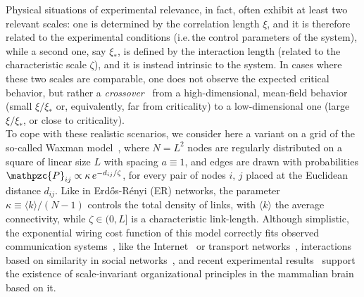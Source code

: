 \documentclass[aps, groupedaddress, superscriptaddress, prl, reprint]{revtex4-1}
\begin{document}
Physical situations of experimental relevance, in fact, often exhibit at least two relevant scales: one is determined by the correlation length $\xi$, and it is therefore related to the experimental conditions (i.e.\,the control parameters of the system), while a second one, say $\xi_*$, is defined by the interaction length (related to the characteristic scale $\zeta$), and it is instead intrinsic to the system.
In cases where these two scales are comparable, one does not observe the expected critical behavior, but rather a {\em crossover}~\cite{Bin001,Pel002} from a high-dimensional, mean-field behavior (small $\xi/\xi_*$ or, equivalently, far from criticality) to a low-dimensional one (large $\xi/\xi_*$, or close to criticality).\\
\indent 
To cope with these realistic scenarios, we consider here a variant on a grid of the so-called Waxman model~\cite{Wax988}, where $N=L^2$ nodes are regularly distributed on a square of linear size $L$ with spacing $a\equiv1$, and edges are drawn with probabilities $\mathpzc{P}_{ij}\propto \kappa\,e^{-d_{ij}/\zeta}$, for every pair of nodes $i,\,j$ placed at the Euclidean distance $d_{ij}$. 
Like in Erd\H{o}s-R\'enyi (ER) networks, the parameter $\kappa\equiv\langle k\rangle/(N-1)$ controls the total density of links, with $\langle k\rangle$ the average connectivity, while $\zeta\in(0,L]$ is a characteristic link-length. %
Although simplistic, the exponential wiring cost function of this model correctly fits observed communication systems~\cite{Wire009}, like the Internet~\cite{Zeg996,Yook2002} or transport networks~\cite{Hal014,Dan016}, interactions based on similarity in social networks~\cite{Watts2002}, and recent experimental results~\cite{Brain1,Bull012,Brain2,Brain3} support the existence of scale-invariant organizational principles in the mammalian brain based on it.\\
\end{document}
